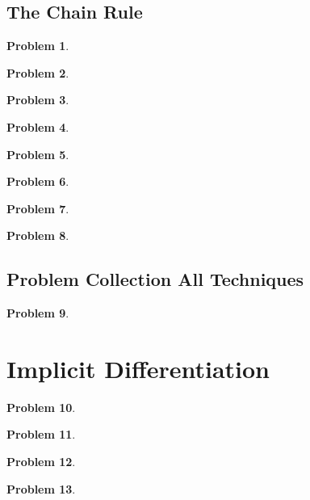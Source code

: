 \documentclass{article}
\newtheorem{problem}{Problem}
\begin{document}
\subsection{The Chain Rule}
\begin{problem}

\end{problem}
\begin{problem}

\end{problem}
\begin{problem}

\end{problem}
\begin{problem}

\end{problem}
\begin{problem}

\end{problem}
\begin{problem}

\end{problem}
\begin{problem}

\end{problem}
\begin{problem}

\end{problem}
\subsection{Problem Collection All Techniques}
\begin{problem}

\end{problem}


\section{Implicit Differentiation}
\begin{problem}

\end{problem}
\begin{problem}

\end{problem}
\begin{problem}

\end{problem}
\begin{problem}

\end{problem}
\end{document}
